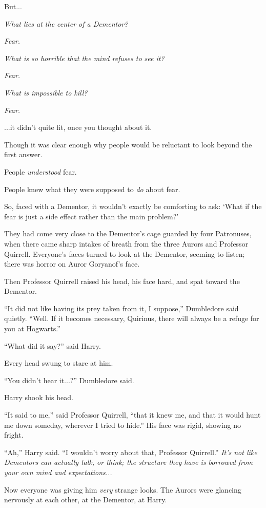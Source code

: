 But...

\emph{What lies at the center of a Dementor?}

\emph{Fear.}

\emph{What is so horrible that the mind refuses to see it?}

\emph{Fear.}

\emph{What is impossible to kill?}

\emph{Fear.}

...it didn't quite fit, once you thought about it.

Though it was clear enough why people would be reluctant to look beyond
the first answer.

People \emph{understood} fear.

People knew what they were supposed to \emph{do} about fear.

So, faced with a Dementor, it wouldn't exactly be comforting to ask:
`What if the fear is just a side effect rather than the main problem?'

They had come very close to the Dementor's cage guarded by four
Patronuses, when there came sharp intakes of breath from the three
Aurors and Professor Quirrell. Everyone's faces turned to look at the
Dementor, seeming to listen; there was horror on Auror Goryanof's face.

Then Professor Quirrell raised his head, his face hard, and spat toward
the Dementor.

``It did not like having its prey taken from it, I suppose,'' Dumbledore
said quietly. ``Well. If it becomes necessary, Quirinus, there will
always be a refuge for you at Hogwarts.''

``What did it say?'' said Harry.

Every head swung to stare at him.

``You didn't hear it...?'' Dumbledore said.

Harry shook his head.

``It said to me,'' said Professor Quirrell, ``that it knew me, and that
it would hunt me down someday, wherever I tried to hide.'' His face was
rigid, showing no fright.

``Ah,'' Harry said. ``I wouldn't worry about that, Professor Quirrell.''
\emph{It's not like Dementors can actually talk, or think; the structure
they have is borrowed from your own mind and expectations...}

Now everyone was giving him \emph{very} strange looks. The Aurors were
glancing nervously at each other, at the Dementor, at Harry.

